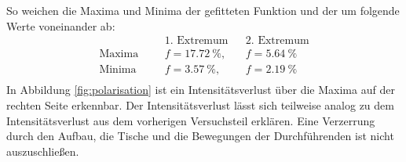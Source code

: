 So weichen die Maxima und Minima der gefitteten Funktion und der um folgende Werte voneinander ab:
\begin{align*}
              &&& \text{1. Extremum}  && \text{2. Extremum}    \\
\text{Maxima} &&& f=\SI{17.72}{\%},   && f=\SI{5.64}{\%} \\
\text{Minima} &&& f=\SI{3.57}{\%},    && f=\SI{2.19}{\%} \\
\end{align*}
In Abbildung \ref{fig:polarisation} ist ein Intensitätsverlust über die Maxima auf der rechten Seite erkennbar.
Der Intensitätsverlust lässt sich teilweise analog zu dem Intensitätsverlust aus dem vorherigen Versuchsteil erklären.
Eine Verzerrung durch den Aufbau, die Tische und die Bewegungen der Durchführenden ist nicht auszuschließen.

